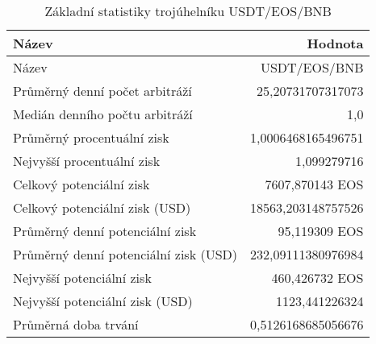 \begin{table}\centering
\caption{Základní statistiky trojúhelníku USDT/EOS/BNB}
\label{USDTEOSBNB_stats}
\begin{tabular}{|| l | r ||}
\hline Název & Hodnota \\ 
\hline\hline Název & USDT/EOS/BNB \\ 
\hline Průměrný denní počet arbitráží & 25,20731707317073 \\ 
\hline Medián denního počtu arbitráží & 1,0 \\ 
\hline Průměrný procentuální zisk & 1,0006468165496751 \\ 
\hline Nejvyšší procentuální zisk & 1,099279716 \\ 
\hline Celkový potenciální zisk & 7607,870143 EOS \\ 
\hline Celkový potenciální zisk (USD) & 18563,203148757526 \\ 
\hline Průměrný denní potenciální zisk & 95,119309 EOS \\ 
\hline Průměrný denní potenciální zisk (USD) & 232,09111380976984 \\ 
\hline Nejvyšší potenciální zisk & 460,426732 EOS \\ 
\hline Nejvyšší potenciální zisk (USD) & 1123,441226324 \\ 
\hline Průměrná doba trvání & 0,5126168685056676 \\ 
\hline
\end{tabular}
\end{table}